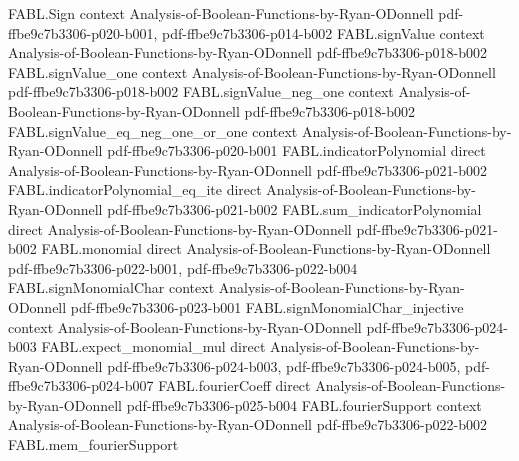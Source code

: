 \begin{theorem}
\label{FABL.totalInfluence_toReal_le_majority_of_monotone}
\leanok
{}
\proofstep
  {FABL.Sign}
  {context}
  {Analysis-of-Boolean-Functions-by-Ryan-ODonnell}
  {pdf-ffbe9c7b3306-p020-b001,
    pdf-ffbe9c7b3306-p014-b002}
\proofstep
  {FABL.signValue}
  {context}
  {Analysis-of-Boolean-Functions-by-Ryan-ODonnell}
  {pdf-ffbe9c7b3306-p018-b002}
\proofstep
  {FABL.signValue_one}
  {context}
  {Analysis-of-Boolean-Functions-by-Ryan-ODonnell}
  {pdf-ffbe9c7b3306-p018-b002}
\proofstep
  {FABL.signValue_neg_one}
  {context}
  {Analysis-of-Boolean-Functions-by-Ryan-ODonnell}
  {pdf-ffbe9c7b3306-p018-b002}
\proofstep
  {FABL.signValue_eq_neg_one_or_one}
  {context}
  {Analysis-of-Boolean-Functions-by-Ryan-ODonnell}
  {pdf-ffbe9c7b3306-p020-b001}
\proofstep
  {FABL.indicatorPolynomial}
  {direct}
  {Analysis-of-Boolean-Functions-by-Ryan-ODonnell}
  {pdf-ffbe9c7b3306-p021-b002}
\proofstep
  {FABL.indicatorPolynomial_eq_ite}
  {direct}
  {Analysis-of-Boolean-Functions-by-Ryan-ODonnell}
  {pdf-ffbe9c7b3306-p021-b002}
\proofstep
  {FABL.sum_indicatorPolynomial}
  {direct}
  {Analysis-of-Boolean-Functions-by-Ryan-ODonnell}
  {pdf-ffbe9c7b3306-p021-b002}
\proofstep
  {FABL.monomial}
  {direct}
  {Analysis-of-Boolean-Functions-by-Ryan-ODonnell}
  {pdf-ffbe9c7b3306-p022-b001,
    pdf-ffbe9c7b3306-p022-b004}
\proofstep
  {FABL.signMonomialChar}
  {context}
  {Analysis-of-Boolean-Functions-by-Ryan-ODonnell}
  {pdf-ffbe9c7b3306-p023-b001}
\proofstep
  {FABL.signMonomialChar_injective}
  {context}
  {Analysis-of-Boolean-Functions-by-Ryan-ODonnell}
  {pdf-ffbe9c7b3306-p024-b003}
\proofstep
  {FABL.expect_monomial_mul}
  {direct}
  {Analysis-of-Boolean-Functions-by-Ryan-ODonnell}
  {pdf-ffbe9c7b3306-p024-b003,
    pdf-ffbe9c7b3306-p024-b005,
    pdf-ffbe9c7b3306-p024-b007}
\proofstep
  {FABL.fourierCoeff}
  {direct}
  {Analysis-of-Boolean-Functions-by-Ryan-ODonnell}
  {pdf-ffbe9c7b3306-p025-b004}
\proofstep
  {FABL.fourierSupport}
  {context}
  {Analysis-of-Boolean-Functions-by-Ryan-ODonnell}
  {pdf-ffbe9c7b3306-p022-b002}
\proofstep
  {FABL.mem_fourierSupport}

\end{theorem}
